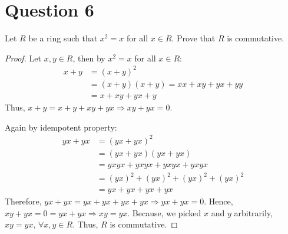 \section{Question 6}

\begin{question}
    Let $R$ be a ring such that $x^2=x$ for all $x \in R$. Prove that $R$ is commutative.
\end{question}

\begin{answer}
    \begin{proof}
        Let $x,y \in R$, then by $x^2 = x$ for all $x \in R$:
        \begin{equation}
            \begin{aligned}
                x+y &= (x+y)^2\\
                &= (x+y)(x+y) = xx + xy + yx + yy\\
                &= x + xy + yx + y
            \end{aligned}
        \end{equation}
        Thus, $x + y = x + y + xy + yx \Rightarrow xy + yx = 0$.
        
        Again by idempotent property:
        \begin{equation}
            \begin{aligned}
                yx + yx &= (yx + yx)^2\\
                &= (yx + yx)(yx + yx)\\
                &= yxyx + yxyx + yxyx +yxyx\\
                &= (yx)^2 + (yx)^2 + (yx)^2 + (yx)^2\\
                &= yx + yx + yx + yx
            \end{aligned}
        \end{equation}
        Therefore, $yx + yx = yx + yx + yx + yx \Rightarrow yx + yx = 0$. Hence, $xy + yx = 0 = yx + yx \Rightarrow xy = yx$. Because, we picked $x$ and $y$ arbitrarily, $xy = yx, \, \forall x, y \in R$. Thus, $R$ is commutative.
    \end{proof}
\end{answer}